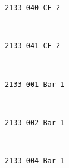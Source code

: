 \documentclass[11pt]{article}
\begin{document}
    \begin{Verbatim}[commandchars=\\\{\}]
2133-040 CF 2

    \end{Verbatim}

    \begin{center}
    \end{center}
    { \hspace*{\fill} \\}
    
    \begin{Verbatim}[commandchars=\\\{\}]
2133-041 CF 2

    \end{Verbatim}

    \begin{center}
    \end{center}
    { \hspace*{\fill} \\}
    
    \begin{Verbatim}[commandchars=\\\{\}]
2133-001 Bar 1

    \end{Verbatim}

    \begin{center}
    \end{center}
    { \hspace*{\fill} \\}
    
    \begin{Verbatim}[commandchars=\\\{\}]
2133-002 Bar 1

    \end{Verbatim}

    \begin{center}
    \end{center}
    { \hspace*{\fill} \\}
    
    \begin{Verbatim}[commandchars=\\\{\}]
2133-004 Bar 1

    \end{Verbatim}
\end{document}
